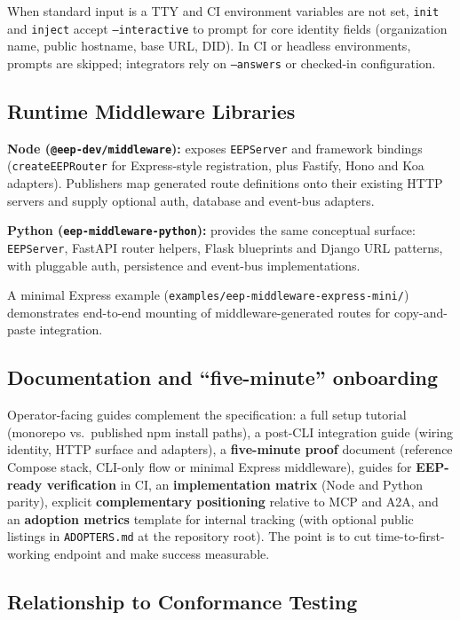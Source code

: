 \documentclass[12pt,a4paper]{article}
\begin{document}
When standard input is a TTY and CI environment variables are not set, \texttt{init} and \texttt{inject} accept \texttt{--interactive} to prompt for core identity fields (organization name, public hostname, base URL, DID). In CI or headless environments, prompts are skipped; integrators rely on \texttt{--answers} or checked-in configuration.

\subsection{Runtime Middleware Libraries}

\textbf{Node (\texttt{@eep-dev/middleware}):} exposes \texttt{EEPServer} and framework bindings (\texttt{createEEPRouter} for Express-style registration, plus Fastify, Hono and Koa adapters). Publishers map generated route definitions onto their existing HTTP servers and supply optional auth, database and event-bus adapters.

\textbf{Python (\texttt{eep-middleware-python}):} provides the same conceptual surface: \texttt{EEPServer}, FastAPI router helpers, Flask blueprints and Django URL patterns, with pluggable auth, persistence and event-bus implementations.

A minimal Express example (\texttt{examples/eep-middleware-express-mini/}) demonstrates end-to-end mounting of middleware-generated routes for copy-and-paste integration.

\subsection{Documentation and ``five-minute'' onboarding}

Operator-facing guides complement the specification: a full setup tutorial (monorepo vs.\ published npm install paths), a post-CLI integration guide (wiring identity, HTTP surface and adapters), a \textbf{five-minute proof} document (reference Compose stack, CLI-only flow or minimal Express middleware), guides for \textbf{EEP-ready verification} in CI, an \textbf{implementation matrix} (Node and Python parity), explicit \textbf{complementary positioning} relative to MCP and A2A, and an \textbf{adoption metrics} template for internal tracking (with optional public listings in \texttt{ADOPTERS.md} at the repository root). The point is to cut time-to-first-working endpoint and make success measurable.

\subsection{Relationship to Conformance Testing}
\end{document}
